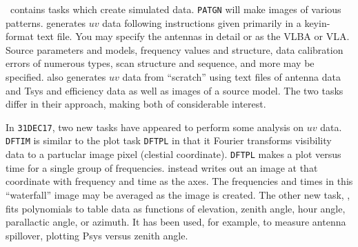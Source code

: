 \AIPS\ contains tasks which create simulated data.  {\tt PATGN} will
make images of various patterns.  {\tt {}} generates $uv$
data following instructions given primarily in a keyin-format text
file.  You may specify the antennas in detail or as the VLBA or VLA\@.
Source parameters and models, frequency values and structure, data
calibration errors of numerous types, scan structure and sequence, and
more may be specified.  {\tt {}} also generates $uv$ data
from ``scratch'' using text files of antenna data and Tsys and
efficiency data as well as images of a source model.  The two tasks
differ in their approach, making both of considerable interest.


In {\tt 31DEC17}, two new tasks have appeared to perform some analysis
on $uv$ data.  {\tt DFTIM} is similar to the plot task {\tt DFTPL} in
that it Fourier transforms visibility data to a partuclar image pixel
(clestial coordinate).  {\tt DFTPL} makes a plot versus time for a
single group of frequencies.  {\tt {}} instead writes out an
image at that coordinate with frequency and time as the axes.  The
frequencies and times in this ``waterfall'' image may be averaged as
the image is created.  The other new task, {\tt {}}, fits
polynomials to table data as functions of elevation, zenith angle,
hour angle, parallactic angle, or azimuth.  It has been used, for
example, to measure antenna spillover, plotting Psys versus zenith
angle.



\bre
{}
\ere



